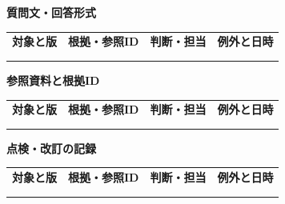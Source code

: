 \documentclass[11pt,a4paper]{article}
\begin{document}
\par{}\noindent\textbf{質問文・回答形式}\par\vspace{1mm}
{\fontsize{8.5}{13}\selectfont
\begin{tabularx}{\linewidth}{@{}XXXX@{}}
\textbf{対象と版} & \textbf{根拠・参照ID} & \textbf{判断・担当} & \textbf{例外と日時}\\[2mm]
\strut & \strut & \strut & \strut\\[5mm]
\strut & \strut & \strut & \strut\\[5mm]
\end{tabularx}
}\vspace{2mm}\par
{}
\par{}\noindent\textbf{参照資料と根拠ID}\par\vspace{1mm}
{\fontsize{8.5}{13}\selectfont
\begin{tabularx}{\linewidth}{@{}XXXX@{}}
\textbf{対象と版} & \textbf{根拠・参照ID} & \textbf{判断・担当} & \textbf{例外と日時}\\[2mm]
\strut & \strut & \strut & \strut\\[5mm]
\strut & \strut & \strut & \strut\\[5mm]
\end{tabularx}
}\vspace{2mm}\par
{}
\par{}\noindent\textbf{点検・改訂の記録}\par\vspace{1mm}
{\fontsize{8.5}{13}\selectfont
\begin{tabularx}{\linewidth}{@{}XXXX@{}}
\textbf{対象と版} & \textbf{根拠・参照ID} & \textbf{判断・担当} & \textbf{例外と日時}\\[2mm]
\strut & \strut & \strut & \strut\\[5mm]
\strut & \strut & \strut & \strut\\[5mm]
\end{tabularx}
}\vspace{2mm}\par
\end{document}
